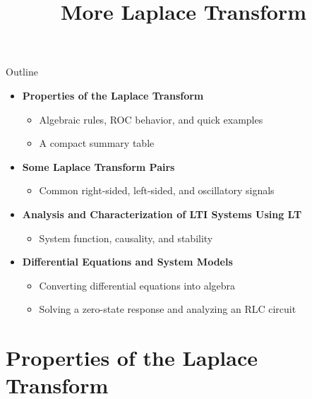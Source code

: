 

\title{More Laplace Transform}




\maketitle

\begin{frame}{Outline}
  \begin{itemize}
    \item \textbf{Properties of the Laplace Transform}
      \begin{itemize}
        \item Algebraic rules, ROC behavior, and quick examples
        \item A compact summary table
      \end{itemize}
    \item \textbf{Some Laplace Transform Pairs}
      \begin{itemize}
        \item Common right-sided, left-sided, and oscillatory signals
      \end{itemize}
    \item \textbf{Analysis and Characterization of LTI Systems Using LT}
      \begin{itemize}
        \item System function, causality, and stability
      \end{itemize}
    \item \textbf{Differential Equations and System Models}
      \begin{itemize}
        \item Converting differential equations into algebra
        \item Solving a zero-state response and analyzing an RLC circuit
      \end{itemize}
  \end{itemize}
\end{frame}

\section{Properties of the Laplace Transform}

